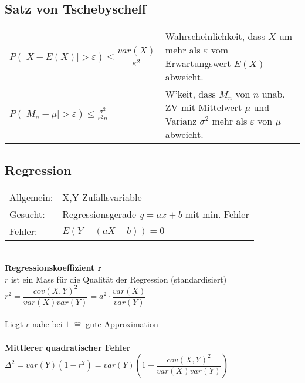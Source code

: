\subsection{Satz von Tschebyscheff }
\begin{tabular}{ll}
  $P(\left| X-E(X) \right|>\varepsilon)\leq\dfrac{var(X)}{\varepsilon^2}$ &
  Wahrscheinlichkeit, dass $X$ um mehr als $\varepsilon$ vom Erwartungswert $E(X)$ abweicht.\\
  $P(|M_{n}-\mu|>\varepsilon)\leq \frac{\sigma^{2}}{\varepsilon^{2}n} $ &
  W'keit, dass $M_{n}$ von $n$ unab. ZV mit Mittelwert $\mu$ und Varianz $\sigma^{2}$ mehr als $\varepsilon$ von $\mu$ abweicht.
\end{tabular}


\begin{minipage}[t]{9cm}
  \subsection{Regression }
  \begin{tabular}{ll}
    Allgemein: & X,Y Zufallsvariable \\
    Gesucht: & Regressionsgerade $y=ax+b$ mit min. Fehler \\
    Fehler: & $E(Y-(aX+b))=0$ \\
  \end{tabular} \\
 
  \textbf{Regressionskoeffizient r} \\
  $r$ ist ein Mass für die Qualität der Regression (standardisiert) \\
  $r^2=\dfrac{cov(X,Y)^2}{var(X)var(Y)}=a^2\cdot\dfrac{var(X)}{var(Y)}$ \\  \\
  Liegt $r$ nahe bei $1$ $\widehat{=}$ gute Approximation\\ \\
 
  \textbf{Mittlerer quadratischer Fehler} \\
  $\Delta^2 = var(Y)(1-r^2) =
  var(Y)\left(1-\dfrac{cov(X,Y)^2}{var(X)var(Y)}\right) $ \\
\end{minipage}
